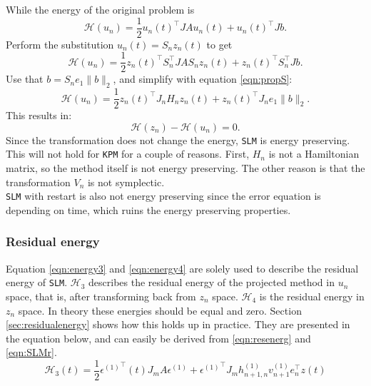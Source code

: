 \noindent While the energy of the original problem is 
\begin{equation*}
\mathcal{H}(u_n) = \frac{1}{2}u_n(t)^\top J A u_n(t) + u_n(t)^\top J b.
\end{equation*}
Perform the substitution $ u_n(t) = S_n z_n(t) $ to get
\begin{equation*}
\mathcal{H}(u_n) = \frac{1}{2}z_n(t)^\top S_n^\top J A S_n z_n(t) + z_n(t)^\top S_n^\top J b.
\end{equation*}
Use that $ b = S_n e_1 \| b \|_2 $, and simplify with equation \eqref{eqn:propS}:
\begin{equation*}
\mathcal{H}(u_n) = \frac{1}{2}z_n(t)^\top J_n H_n z_n(t) + z_n(t)^\top J_n e_1 \|b \|_2.
\end{equation*}
This results in: 
\begin{equation*}
\mathcal{H}(z_n) - \mathcal{H}(u_n) = 0.
\end{equation*}
Since the transformation does not change the energy, \texttt{SLM} is energy preserving. This will not hold for \texttt{KPM} for a couple of reasons. First, $H_n$ is not a Hamiltonian matrix, so the method itself is not energy preserving. The other reason is that the transformation $V_n$ is not symplectic.\\ 
\texttt{SLM} with restart is also not energy preserving since the error equation is depending on time, which ruins the energy preserving properties. %
\subsubsection{Residual energy}
Equation \eqref{eqn:energy3} and \eqref{eqn:energy4} are solely used to describe the residual energy of \texttt{SLM}. $\mathcal{H}_3$ describes the residual energy of the projected method in $u_n$ space, that is, after transforming back from $z_n$ space. $\mathcal{H}_4$ is the residual energy in $z_n$ space. In theory these energies should be equal and zero. Section \ref{sec:residualenergy} shows how this holds up in practice. 
They are presented in the equation below, and can easily be derived from \eqref{eqn:resenerg} and \eqref{eqn:SLMr}. \\
\begin{equation}
\mathcal{H}_3 (t) = \frac{1}{2} {\epsilon^{(1)}}^\top (t) J_m A \epsilon^{(1)} + {\epsilon^{(1)}}^\top J_m h_{n+1,n}^{(1)} v_{n+1}^{(1)} e_n^\top z(t)
\label{eqn:energy3}
\end{equation}

